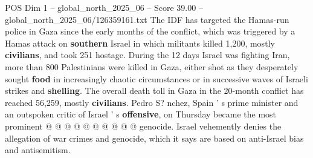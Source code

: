 \begin{textsample}{POS Dim 1 – global\_north\_2025\_06 – Score 39.00 – global\_north\_2025\_06/126359161.txt}
The IDF has targeted the Hamas-run police in Gaza since the early months of the conflict, which was triggered by a Hamas attack on \textbf{southern} Israel in which militants killed 1,200, mostly \textbf{civilians}, and took 251 hostage.
During the 12 days Israel was fighting Iran, more than 800 Palestinians were killed in Gaza, either shot as they desperately sought \textbf{food} in increasingly chaotic circumstances or in successive waves of Israeli strikes and \textbf{shelling}.
The overall death toll in Gaza in the 20-month conflict has reached 56,259, mostly \textbf{civilians}.
Pedro S? nchez, Spain ' s prime minister and an outspoken critic of Israel ' s \textbf{offensive}, on Thursday became the most prominent @ @ @ @ @ @ @ @ @ @ genocide.
Israel vehemently denies the allegation of war crimes and genocide, which it says are based on anti-Israel bias and antisemitism.

\end{textsample}
